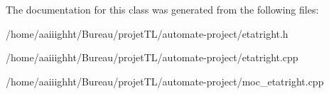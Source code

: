 The documentation for this class was generated from the following files\-:\begin{DoxyCompactItemize}
\item 
/home/aaiiighht/\-Bureau/projet\-T\-L/automate-\/project/etatright.\-h\item 
/home/aaiiighht/\-Bureau/projet\-T\-L/automate-\/project/etatright.\-cpp\item 
/home/aaiiighht/\-Bureau/projet\-T\-L/automate-\/project/moc\-\_\-etatright.\-cpp\end{DoxyCompactItemize}
